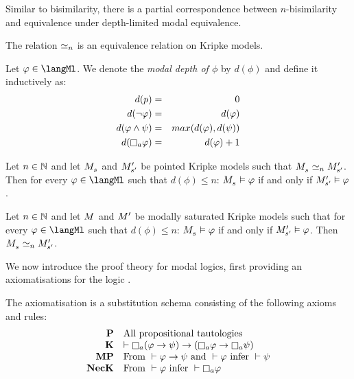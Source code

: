Similar to bisimilarity, there is a partial correspondence between $n$-bisimilarity and equivalence under depth-limited modal equivalence.

\begin{proposition}
The relation $\bisimilar[n]$ is an equivalence relation on Kripke models.
\end{proposition}

\begin{definition}
Let $\phi \in \langMl$.
We denote the {\em modal depth of $\phi$} by $d(\phi)$ and define it inductively as:
\begin{eqnarray*}
    d(\atomP) &=& 0\\
    d(\lnot \phi) &=& d(\phi)\\
    d(\phi \land \psi) &=& max(d(\phi), d(\psi))\\
    d(\necessaryA \phi) &=& d(\phi) + 1
\end{eqnarray*}
\end{definition}

\begin{proposition}
Let $n \in \naturals$ and let $\kPModel{\kStateS}$ and $\kPModelP{\kStateSP}$ be pointed Kripke models such that $\kPModel{\kStateS} \bisimilar[n] \kPModelP{\kStateSP}$.
Then for every $\phi \in \langMl$ such that $d(\phi) \leq n$:
$\kPModel{\kStateS} \entails \phi$ if and only if $\kPModelP{\kStateSP} \entails \phi$.
\end{proposition}

\begin{proposition}
Let $n \in \naturals$ and let $\kModel$ and $\kModelP$ be modally saturated Kripke models such that for every $\phi \in \langMl$ such that $d(\phi) \leq n$: $\kPModel{\kStateS} \entails \phi$ if and only if $\kPModelP{\kStateSP} \entails \phi$.
Then $\kPModel{\kStateS} \bisimilar[n] \kPModelP{\kStateSP}$.
\end{proposition}

We now introduce the proof theory for modal logics, first providing an axiomatisations for the logic \logicK{}.

\begin{definition}
The axiomatisation \axiomK{} is a substitution schema consisting of the following axioms and rules:
$$
\begin{array}{rl}
    {\bf P}     & \text{All propositional tautologies}\\
    {\bf K}     & \proves \necessaryA (\phi \implies \psi) \implies (\necessaryA \phi \implies \necessaryA \psi)\\
    {\bf MP}    & \text{From } \proves \phi \implies \psi \text{ and } \proves \phi \text{ infer } \proves \psi\\
    {\bf NecK}  & \text{From } \proves \phi \text{ infer } \proves \necessaryA \phi
\end{array}
$$
\end{definition}


